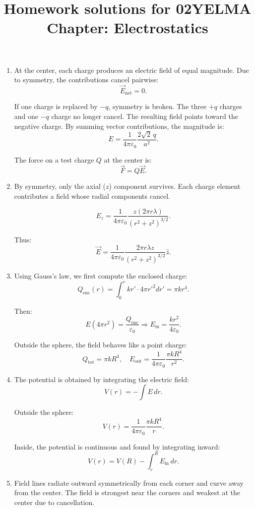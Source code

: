 \documentclass[12pt]{article}
\title{Homework solutions for 02YELMA \\ Chapter: Electrostatics}
\begin{document}
\date{}
\maketitle
\vspace{-0.8in}

\begin{enumerate}

\item At the center, each charge produces an electric field of equal magnitude. Due to symmetry, the contributions cancel pairwise:
\[
\vec{E}_{\text{net}} = 0.
\]

If one charge is replaced by $-q$, symmetry is broken. The three $+q$ charges and one $-q$ charge no longer cancel. The resulting field points toward the negative charge. By summing vector contributions, the magnitude is:
\[
E = \frac{1}{4\pi\varepsilon_0}\frac{2\sqrt{2}\,q}{a^2}.
\]

The force on a test charge $Q$ at the center is:
\[
\vec{F} = Q \vec{E}.
\]

\item By symmetry, only the axial ($z$) component survives. Each charge element contributes a field whose radial components cancel.

\[
E_z = \frac{1}{4\pi\varepsilon_0} \frac{z (2\pi r \lambda)}{(r^2 + z^2)^{3/2}}.
\]

Thus:
\[
\vec{E} = \frac{1}{4\pi\varepsilon_0}\frac{2\pi r \lambda z}{(r^2+z^2)^{3/2}} \hat{z}.
\]

\item Using Gauss’s law, we first compute the enclosed charge:
\[
Q_{\text{enc}}(r) = \int_0^r kr' \cdot 4\pi r'^2 dr' = \pi k r^4.
\]

Then:
\[
E(4\pi r^2) = \frac{Q_{\text{enc}}}{\varepsilon_0}
\Rightarrow
E_{\text{in}} = \frac{k r^2}{4\varepsilon_0}.
\]

Outside the sphere, the field behaves like a point charge:
\[
Q_{\text{tot}} = \pi k R^4, \quad
E_{\text{out}} = \frac{1}{4\pi\varepsilon_0}\frac{\pi k R^4}{r^2}.
\]

\item The potential is obtained by integrating the electric field:
\[
V(r) = -\int E \, dr.
\]

Outside the sphere:
\[
V(r) = \frac{1}{4\pi\varepsilon_0}\frac{\pi k R^4}{r}.
\]

Inside, the potential is continuous and found by integrating inward:
\[
V(r) = V(R) - \int_r^R E_{\text{in}} \, dr.
\]

\item Field lines radiate outward symmetrically from each corner and curve away from the center. The field is strongest near the corners and weakest at the center due to cancellation.


\end{enumerate}
\end{document}
